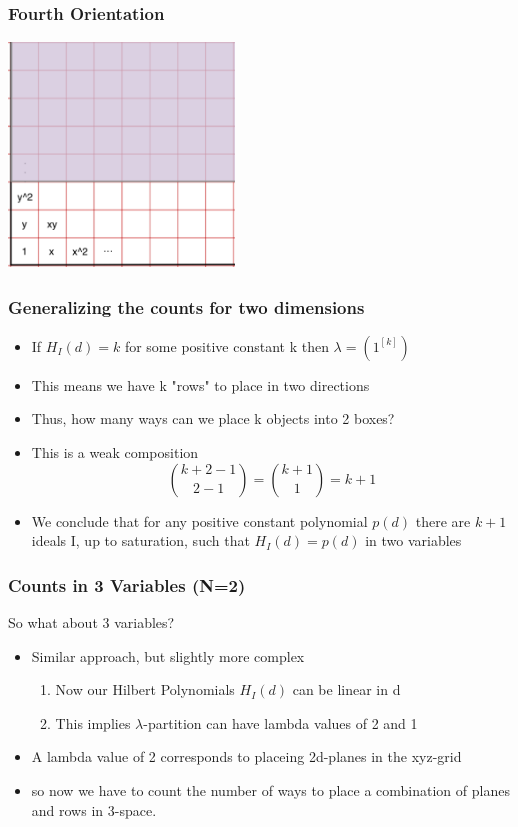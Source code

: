 \documentclass{beamer}
\begin{document}
\begin{frame}
	\frametitle{Fourth Orientation}
	\begin{center}
	\includegraphics[width=6cm, height=6cm]{LogMMidtermPresentationImages/hpis3fourthorientation.png}
	\end{center}
\end{frame}

\begin{frame}
	\frametitle{Generalizing the counts for two dimensions}
	\begin{itemize}
	\item If $H_I(d)= k$ for some positive constant k then $\lambda = {(1^{[k]})}$
	\item This means we have k "rows" to place in two directions
	\item Thus, how many ways can we place k objects into 2 boxes?
	\item This is a weak composition
	\[\binom{k+2-1}{2-1}= \binom{k+1}{1} = k+1\]
	\item We conclude that for any positive constant polynomial $p(d)$  there are $k+1$ ideals I, up to saturation, such that $H_I(d)= p(d)$ in two variables{}
	\end{itemize}
\end{frame}

\begin{frame}
	\frametitle{Counts in 3 Variables (N=2)}
	So what about 3 variables?
	\begin{itemize}
	\item Similar approach, but slightly more complex
	\begin{enumerate}
	\item Now our Hilbert Polynomials $H_I(d)$ can be linear in d
	\item This implies $\lambda$-partition can have lambda values of 2 and 1
	\end{enumerate}
	\item A lambda value of 2 corresponds to placeing 2d-planes in the xyz-grid
	\item so now we have to count the number of ways to place a combination of planes and rows in 3-space.
	\end{itemize}
\end{frame}
\end{document}
